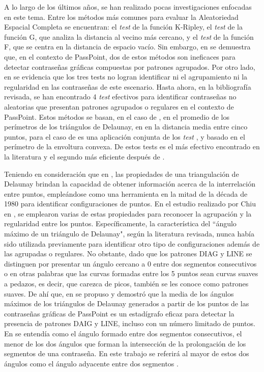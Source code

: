 \documentclass[12pt]{report}
\begin{document}
	A lo largo de los últimos años, se han realizado pocas investigaciones enfocadas en este tema. Entre los métodos más comunes para evaluar la Aleatoriedad Espacial Completa se encuentran: el \textit{test} de la función K-Ripley, el \textit{test} de la función G, que analiza la distancia al vecino más cercano, y el \textit{test} de la función F, que se centra en la distancia de espacio vacío. Sin embargo, en \cite{6,7} se demuestra que, en el contexto de PassPoint, dos de estos métodos son ineficaces para detectar contraseñas gráficas compuestas por patrones agrupados. Por otro lado, en \cite{7,8} se evidencia que los tres tests no logran identificar ni el agrupamiento ni la regularidad en las contraseñas de este escenario. Hasta ahora, en la bibliografía revisada, se han encontrado 4 \textit{test} efectivos \cite{7,9,10,11} para identificar contraseñas no aleatorias que presentan patrones agrupados o regulares en el contexto de PassPoint. Estos métodos se basan, en el caso de \cite{9}, en el promedio de los perímetros de los triángulos de Delaunay, en  \cite{7} en la distancia media entre cinco puntos, para el caso de \cite{10} es una aplicación conjunta de los \textit{test} \cite{7,9}, y \cite{11} basado en  el perímetro de la envoltura convexa. De estos tests \cite{11} es el más efectivo encontrado en la literatura y el segundo más eficiente después de \cite{7}.
	
	Teniendo en consideración que en \cite{12}, las propiedades de una triangulación de Delaunay brindan la capacidad de obtener información acerca de la interrelación entre puntos, empleándose como una herramienta en la mitad de la década de 1980 para identificar configuraciones de puntos. En el estudio realizado por Chiu en \cite{12}, se emplearon varias de estas propiedades para reconocer la agrupación y la regularidad entre los puntos. Específicamente, la característica del ``ángulo máximo de un triángulo de Delaunay", según la literatura revisada, nunca había sido utilizada previamente para identificar otro tipo de configuraciones además de las agrupadas o regulares. No obstante, dado que los patrones DIAG y LINE se distinguen por presentar un ángulo cercano a 0{\degree } entre dos segmentos consecutivos o en otras palabras que las curvas formadas entre los 5 puntos sean curvas suaves a pedazos, es decir, que carezca de picos, también se les conoce como patrones suaves.  De ahí que, en \cite{13} se propuso y demostró que la media de los ángulos máximos de los triángulos de Delaunay generados a partir de los puntos de las contraseñas gráficas de PassPoint es un estadígrafo eficaz para detectar la presencia de patrones DAIG y LINE, incluso con un número limitado de puntos. En \cite{5} se entendía como el ángulo formado entre dos segmentos consecutivos, el menor de los dos ángulos que forman la intersección de la prolongación de los segmentos de una contraseña. En este trabajo se referirá al mayor de estos dos ángulos como el ángulo adyacente entre dos segmentos .
\end{document}
